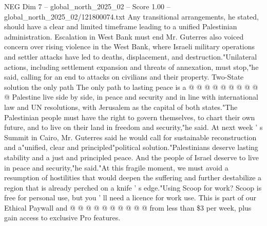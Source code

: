\begin{textsample}{NEG Dim 7 – global\_north\_2025\_02 – Score 1.00 – global\_north\_2025\_02/121800074.txt}
Any transitional arrangements, he stated, should have a clear and limited timeframe leading to a unified Palestinian administration.
Escalation in West Bank must end Mr.
Guterres also voiced concern over rising violence in the West Bank, where Israeli military operations and settler attacks have led to deaths, displacement, and destruction."Unilateral actions, including settlement expansion and threats of annexation, must stop,"he said, calling for an end to attacks on civilians and their property.
Two-State solution the only path The only path to lasting peace is a @ @ @ @ @ @ @ @ @ @ Palestine live side by side, in peace and security and in line with international law and UN resolutions, with Jerusalem as the capital of both states."The Palestinian people must have the right to govern themselves, to chart their own future, and to live on their land in freedom and security,"he said.
At next week ' s Summit in Cairo, Mr.
Guterres said he would call for sustainable reconstruction and a"unified, clear and principled"political solution."Palestinians deserve lasting stability and a just and principled peace.
And the people of Israel deserve to live in peace and security,"he said."At this fragile moment, we must avoid a resumption of hostilities that would deepen the suffering and further destabilize a region that is already perched on a knife ' s edge."Using Scoop for work?
Scoop is free for personal use, but you ' ll need a licence for work use.
This is part of our Ethical Paywall and @ @ @ @ @ @ @ @ @ @ from less than \$3 per week, plus gain access to exclusive Pro features.

\end{textsample}

